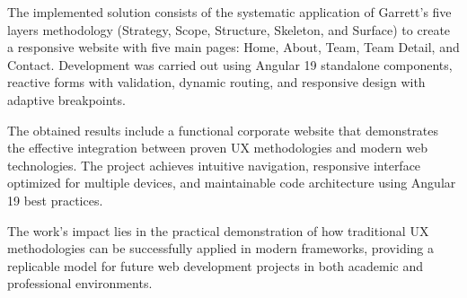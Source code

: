 The implemented solution consists of the systematic application of Garrett's five layers methodology (Strategy, Scope, Structure, Skeleton, and Surface) to create a responsive website with five main pages: Home, About, Team, Team Detail, and Contact. Development was carried out using Angular 19 standalone components, reactive forms with validation, dynamic routing, and responsive design with adaptive breakpoints.

The obtained results include a functional corporate website that demonstrates the effective integration between proven UX methodologies and modern web technologies. The project achieves intuitive navigation, responsive interface optimized for multiple devices, and maintainable code architecture using Angular 19 best practices.

The work's impact lies in the practical demonstration of how traditional UX methodologies can be successfully applied in modern frameworks, providing a replicable model for future web development projects in both academic and professional environments.


\MediaOptionLogicBlank